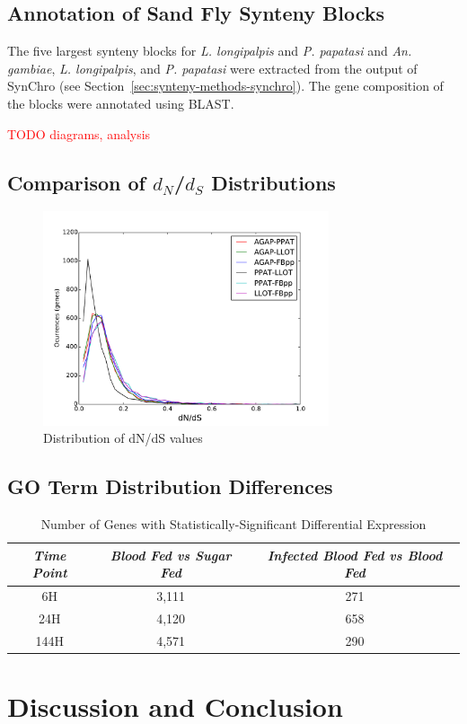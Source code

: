 \subsection{Annotation of Sand Fly Synteny Blocks}
The five largest synteny blocks for \emph{L. longipalpis} and \emph{P. papatasi} and \emph{An. gambiae}, \emph{L. longipalpis}, and \emph{P. papatasi} were extracted from the output of SynChro (see Section~\ref{sec:synteny-methods-synchro}).  The gene composition of the blocks were annotated using BLAST.

\textcolor{red}{TODO diagrams, analysis}

\subsection{Comparison of $d_N$/$d_S$ Distributions}
\begin{figure}[H]
  \centering
  \includegraphics[width=0.75\textwidth]{figures/ka_ks/dN_dS}
  \caption{Distribution of dN/dS values}
  \label{fig:dnds-distr}
\end{figure}

\subsection{GO Term Distribution Differences}

\begin{table}[H]
  \centering
  \begin{tabular}{c c c} \hline
  \emph{Time Point} & \emph{Blood Fed vs Sugar Fed} & \emph{Infected Blood Fed vs Blood Fed} \\ \hline
  6H & 3,111 & 271 \\ \hline
  24H & 4,120 & 658 \\ \hline
  144H & 4,571 & 290 \\ \hline
  \end{tabular}
  \caption{Number of Genes with Statistically-Significant Differential Expression}
  \label{tab:stat-sig-genes}
\end{table}

\section{Discussion and Conclusion}
